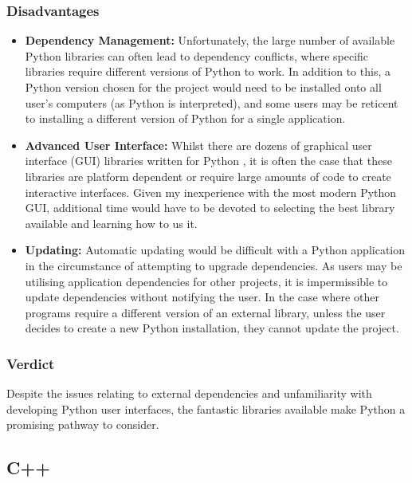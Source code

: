 \documentclass[titlesmallcaps, examinerscopy, copyrightpage]{uqthesis}
\begin{document}
\subsubsection{Disadvantages}

\begin{itemize}
\item \textbf{Dependency Management:} Unfortunately, the large number of available Python libraries can often lead to dependency conflicts, where specific libraries require different versions of Python to work. In addition to this, a Python version chosen for the project would need to be installed onto all user's computers (as Python is interpreted), and some users may be reticent to installing a different version of Python for a single application.

\item \textbf{Advanced User Interface:} Whilst there are dozens of graphical user interface (GUI) libraries written for Python \cite{PythonGUI}, it is often the case that these libraries are platform dependent or require large amounts of code to create interactive interfaces. Given my inexperience with the most modern Python GUI, additional time would have to be devoted to selecting the best library available and learning how to us it.

\item \textbf{Updating:} Automatic updating would be difficult with a Python application in the circumstance of attempting to upgrade dependencies. As users may be utilising application dependencies for other projects, it is impermissible to update dependencies without notifying the user. In the case where other programs require a different version of an external library, unless the user decides to create a new Python installation, they cannot update the project.

\end{itemize}

\subsubsection{Verdict}

Despite the issues relating to external dependencies and unfamiliarity with developing Python user interfaces, the fantastic libraries available make Python a promising pathway to consider.


\subsection{C++}
\end{document}

